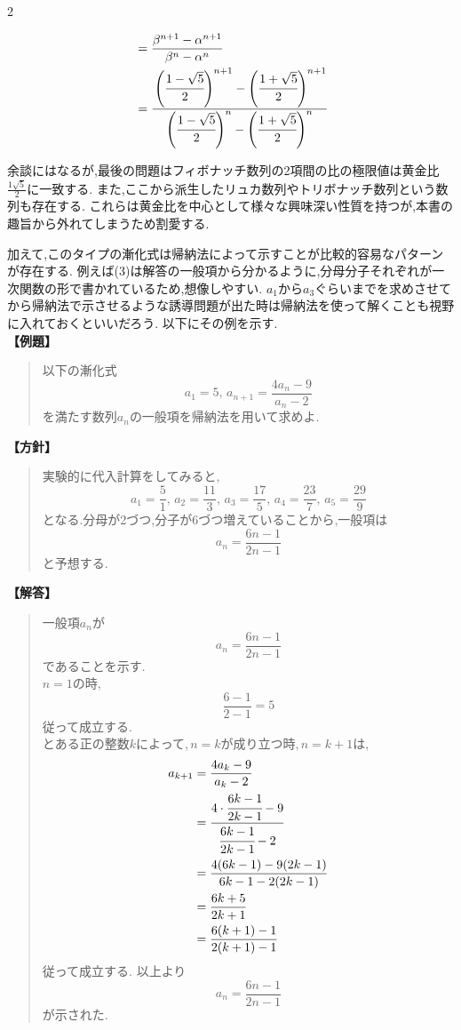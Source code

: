 \documentclass[dvipdfmx,a4paper,11pt,fleqn,openany]{jsbook}
\renewcommand{\qed}{\unskip\nobreak\quad\qedsymbol}
\begin{document}
\begin{multicols*}{2}
\begin{enumerate}[label=(\arabic*),parsep=3pt]
\begin{align*}
                &=\frac{\beta^{n+1}-\alpha^{n+1}}{\beta^n-\alpha^n}\\
                &=\cfrac{\left(\cfrac{1-\sqrt{5}}{2}\right)^{n+1}-\left(\cfrac{1+\sqrt{5}}{2}\right)^{n+1}}{\left(\cfrac{1-\sqrt{5}}{2}\right)^n-\left(\cfrac{1+\sqrt{5}}{2}\right)^n}
              \end{align*}        
      \end{enumerate}
    余談にはなるが,最後の問題はフィボナッチ数列の2項間の比の極限値は黄金比$\frac{1\sqrt{5}}{2}$に一致する.
    また,ここから派生したリュカ数列やトリボナッチ数列という数列も存在する.
    これらは黄金比を中心として様々な興味深い性質を持つが,本書の趣旨から外れてしまうため割愛する.

    加えて,このタイプの漸化式は帰納法によって示すことが比較的容易なパターンが存在する.
    例えば(3)は解答の一般項から分かるように,分母分子それぞれが一次関数の形で書かれているため,想像しやすい.
    $a_1$から$a_3$ぐらいまでを求めさせてから帰納法で示させるような誘導問題が出た時は帰納法を使って解くことも視野に入れておくといいだろう.
    以下にその例を示す.\\
      \noindent\textbf{【例題】}
      \begin{quote}
        以下の漸化式
        \[
          a_1=5,\, a_{n+1}=\dfrac{4a_{n}-9}{a_{n}-2}
        \]
        を満たす数列$a_n$の一般項を帰納法を用いて求めよ.
      \end{quote}
      \textbf{【方針】}
      \begin{quote}
        実験的に代入計算をしてみると,
        \[
          a_1=\frac{5}{1},\,a_2=\frac{11}{3},\,a_3=\frac{17}{5},\,a_4=\frac{23}{7},\,a_5=\frac{29}{9}
        \]
        となる.分母が2づつ,分子が6づつ増えていることから,一般項は
        \[
          a_n=\frac{6n-1}{2n-1}
        \]
        と予想する.
      \end{quote}
      \textbf{【解答】}
      \begin{quote}
        一般項$a_n$が
        \[
          a_n=\frac{6n-1}{2n-1}
        \]
        であることを示す.\\
        $n=1$の時,
        \[
          \frac{6-1}{2-1}=5
        \]
        従って成立する.\\
        とある正の整数$k$によって,\,$n=k$が成り立つ時,\,$n=k+1$は,
        \begin{align*}
          a_{k+1}&=\frac{4a_{k}-9}{a_{k}-2}\\
          &=\cfrac{4\cdot \cfrac{6k-1}{2k-1}-9}{\cfrac{6k-1}{2k-1}-2}\\
          &=\frac{4(6k-1)-9(2k-1)}{6k-1-2(2k-1)}\\
          &=\frac{6k+5}{2k+1}\\
          &=\frac{6(k+1)-1}{2(k+1)-1}
        \end{align*}
        従って成立する.
        以上より
        \[
          a_n=\frac{6n-1}{2n-1}
        \]
        が示された.\qed


\end{quote}
\end{multicols*}
\end{document}
